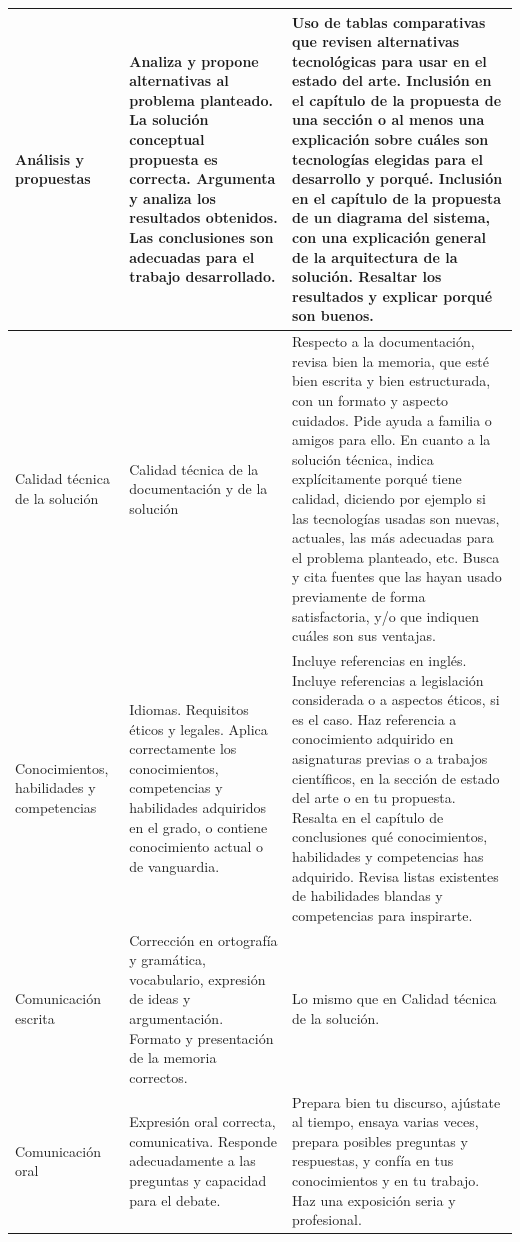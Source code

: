 {\begin{table}
{\begin{tabular}{|p{3cm} |p{5cm}| p{15cm}|}
Análisis y propuestas & Analiza y propone alternativas al problema planteado. La solución conceptual propuesta es correcta. Argumenta y analiza los resultados obtenidos. Las conclusiones son adecuadas para el trabajo desarrollado. & Uso de tablas comparativas que revisen alternativas tecnológicas para usar en el estado del arte. Inclusión en el capítulo de la propuesta de una sección o al menos una explicación sobre cuáles son tecnologías elegidas para el desarrollo y porqué. Inclusión en el capítulo de la propuesta de un diagrama del sistema, con una explicación general de la arquitectura de la solución. Resaltar los resultados y explicar porqué son buenos. \\  \hline

Calidad técnica de la solución & Calidad técnica de la documentación y de la solución &  Respecto a la documentación, revisa bien la memoria, que esté bien escrita y bien estructurada, con un formato y aspecto cuidados. Pide ayuda a familia o amigos para ello. En cuanto a la solución técnica, indica explícitamente porqué tiene calidad, diciendo por ejemplo si las tecnologías usadas son nuevas, actuales, las más adecuadas para el problema planteado, etc. Busca y cita fuentes que las hayan usado previamente de forma satisfactoria, y/o que indiquen cuáles son sus ventajas.\\ \hline

Conocimientos, habilidades y competencias &	Idiomas. Requisitos éticos y legales. Aplica correctamente los conocimientos, competencias y habilidades adquiridos en el grado, o contiene conocimiento actual o de vanguardia. & Incluye referencias en inglés. Incluye referencias a legislación considerada o a aspectos éticos, si es el caso. Haz referencia a conocimiento adquirido en asignaturas previas o a trabajos científicos, en la sección de estado del arte o en tu propuesta. Resalta en el capítulo de conclusiones qué conocimientos, habilidades y competencias has adquirido. Revisa listas existentes de habilidades blandas y competencias para inspirarte.  \\ \hline

Comunicación escrita &	Corrección en ortografía y gramática, vocabulario, expresión de ideas y argumentación. Formato y presentación de la memoria correctos. &  Lo mismo que en Calidad técnica de la solución. \\ \hline

Comunicación oral &	Expresión oral correcta, comunicativa. Responde adecuadamente a las preguntas y capacidad para el debate. & Prepara bien tu discurso, ajústate al tiempo, ensaya varias veces, prepara posibles preguntas y respuestas, y confía en tus conocimientos y en tu trabajo. Haz una exposición seria y profesional. \\ \hline


\end{tabular}}
\end{table}}
